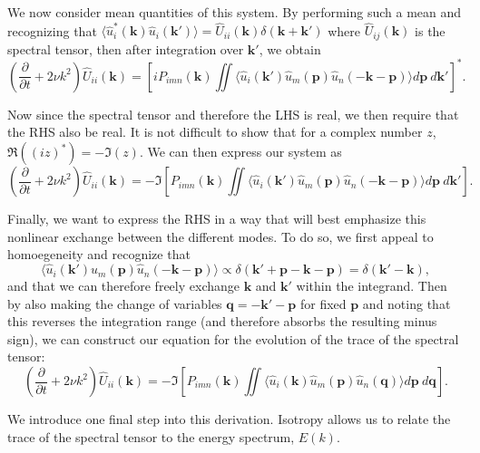 \documentclass[letterpaper, 11pt, onecolumn, oneside]{article}
\newcommand{\pdiff}[2]{\frac{\partial #1}{\partial #2}}
\begin{document}
We now consider mean quantities of this system. By performing such a mean and recognizing that $\langle\hat{u}^*_i(\bm{k}) \hat{u}_i(\bm{k}')\rangle = \widehat{U}_{ii}(\bm{k}) \delta(\bm{k}+\bm{k}')$ where $\widehat{U}_{ij}(\bm{k})$ is the spectral tensor, then after integration over $\bm{k}'$, we obtain
\begin{equation}
	\left(\pdiff{}{t} + 2 \nu k^2 \right) \widehat{U}_{ii}(\bm{k}) = \left[i P_{imn}(\bm{k}) \iint \langle \hat{u}_i(\bm{k}') \hat{u}_m(\bm{p}) \hat{u}_n(-\bm{k} - \bm{p}) \rangle d\bm{p} \ d\bm{k}' \right]^*.
\end{equation}

Now since the spectral tensor and therefore the LHS is real, we then require that the RHS also be real. It is not difficult to show that for a complex number $z$, $\Re((iz)^*) = -\Im(z)$. We can then express our system as
\begin{equation}
	\left(\pdiff{}{t} + 2 \nu k^2 \right) \widehat{U}_{ii}(\bm{k}) = -\Im \left[ P_{imn}(\bm{k}) \iint \langle \hat{u}_i(\bm{k}') \hat{u}_m(\bm{p}) \hat{u}_n(-\bm{k} - \bm{p}) \rangle d\bm{p} \ d\bm{k}' \right].
\end{equation}

Finally, we want to express the RHS in a way that will best emphasize this nonlinear exchange between the different modes. To do so, we first appeal to homoegeneity and recognize that
\begin{equation*}
	\langle \hat{u}_i(\bm{k}') \hat{u}_m(\bm{p}) \hat{u}_n(-\bm{k} - \bm{p}) \rangle \propto \delta(\bm{k}' + \bm{p} - \bm{k} - \bm{p}) = \delta(\bm{k}' - \bm{k}),
\end{equation*}
and that we can therefore freely exchange $\bm{k}$ and $\bm{k}'$ within the integrand. Then by also making the change of variables $\bm{q} = -\bm{k}' - \bm{p}$ for fixed $\bm{p}$ and noting that this reverses the integration range (and therefore absorbs the resulting minus sign), we can construct our equation for the evolution of the trace of the spectral tensor:
\begin{equation}
\left(\pdiff{}{t} + 2 \nu k^2 \right) \widehat{U}_{ii}(\bm{k}) = -\Im \left[ P_{imn}(\bm{k}) \iint \langle \hat{u}_i(\bm{k}) \hat{u}_m(\bm{p}) \hat{u}_n(\bm{q}) \rangle d\bm{p} \ d\bm{q} \right].
\end{equation}

We introduce one final step into this derivation. Isotropy allows us to relate the trace of the spectral tensor to the energy spectrum, $E(k)$.
\end{document}
